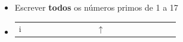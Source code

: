 \documentclass[portuguese,10pt,xcolor=table]{bredelebeamer}
\begin{document}
	\begin{frame}
		\begin{itemize}
			\item Escrever \textbf{todos} os números primos de 1 a 17
			\item
				\begin{table}
					\small
					\setlength{\tabcolsep}{2pt}	
					\begin{tabular}{|c| c| c| c| c| c| c| c| c| c| c| c| c| c| c| c| c| c|}
						\hline
							&\VN[1] &\VN[2] &\VN[3] &\VN[4] &\VN[5] &\VN[6] &\VN[7] &\VN[8] &\VN[9] &\WN[10] &\WN[11] &\WN[12] &\WN[13] &\WN[14] &\WN[15] &\WN[16] & \WN[17] \\\hline
						i &  &  &  &  & & & &  & $\uparrow$ &  &  &  &  &  &  & & \\\hline
					\end{tabular}
				\end{table}

				
		\end{itemize}
	\end{frame}	
	\begin{frame}
				
	\end{frame}

	\begin{frame}
		
		

	\end{frame}
\end{document}
